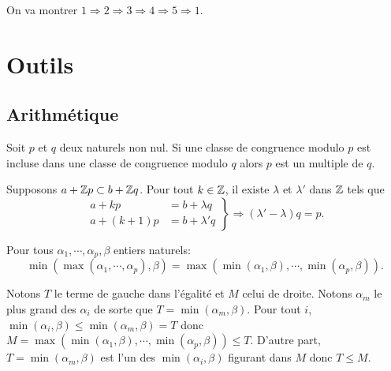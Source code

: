 \begin{demo}
 On va montrer $1 \Rightarrow 2 \Rightarrow 3 \Rightarrow 4 \Rightarrow 5 \Rightarrow 1$.
\end{demo}

\chapter{Outils} \label{Chap:Outils}

\section{Arithmétique}
\begin{propn}
Soit $p$ et $q$ deux naturels non nul. Si une classe de congruence modulo $p$ est incluse dans une classe de congruence modulo $q$ alors $p$ est un multiple de $q$.
\end{propn}
\begin{demo}
 Supposons $a+\mathbb{Z} p \subset b + \mathbb{Z} q$. Pour tout $k \in \mathbb{Z}$, il existe $\lambda$ et $\lambda'$ dans $\mathbb{Z}$ tels que
\begin{displaymath}
 \left.
   \begin{aligned}
    a + kp &= b + \lambda q \\
    a + (k+1)p &= b + \lambda' q
   \end{aligned}
  \right\rbrace
  \Rightarrow (\lambda' - \lambda) q = p.
\end{displaymath}
\end{demo}

\begin{lem}
  Pour tous $\alpha_1, \cdots, \alpha_p, \beta$ entiers naturels:
  \begin{displaymath}
    \min \left( \max(\alpha_1, \cdots, \alpha_p) , \beta \right) = \max\left( \min(\alpha_1, \beta), \cdots , \min(\alpha_p,\beta)\right).
  \end{displaymath}
\end{lem}
\begin{demo}
  Notons $T$ le terme de gauche dans l'égalité et $M$ celui de droite. Notons $\alpha_m$ le plus grand des $\alpha_i$ de sorte que $T = \min(\alpha_m, \beta)$.\newline
  Pour tout $i$, $\min(\alpha_i, \beta) \leq \min (\alpha_m, \beta) = T$ donc $M = \max\left( \min(\alpha_1, \beta), \cdots , \min(\alpha_p,\beta)\right) \leq T$.\newline
  D'autre part, $T=\min (\alpha_m, \beta)$ est l'un des $\min(\alpha_i, \beta)$ figurant dans $M$ donc $T \leq M$.
\end{demo}

